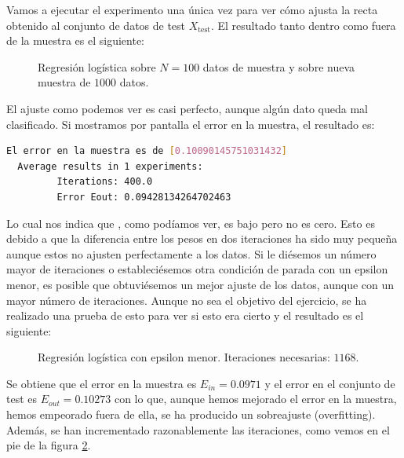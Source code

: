 \documentclass[12pt]{article}
\begin{document}
{Vamos a ejecutar el experimento una única vez para ver cómo ajusta la recta obtenido al conjunto de datos de test $X_{\operatorname{test}}$. El resultado  tanto dentro como fuera de la muestra es el siguiente:
\begin{figure}[H]
  \centering
  \qquad
  \caption{Regresión logística sobre $N=100$ datos de muestra y sobre nueva muestra de $1000$ datos. }
  \label{fig:myfig:2}
\end{figure}
El ajuste como podemos ver es casi perfecto, aunque algún dato queda mal clasificado. Si mostramos por pantalla el error en la muestra, el resultado es:
\begin{lstlisting}[language=bash]
  El error en la muestra es de [0.10090145751031432]
  Average results in 1 experiments:
         Iterations: 400.0
         Error Eout: 0.09428134264702463
\end{lstlisting}

Lo cual nos indica que , como podíamos ver, es bajo pero no es cero. Esto es debido a que la diferencia entre los pesos en dos iteraciones ha sido muy pequeña aunque estos no ajusten perfectamente a los datos. Si le diésemos un número mayor de iteraciones o estableciésemos otra condición de parada con un epsilon menor, es posible que obtuviésemos un mejor ajuste de los datos, aunque con un mayor número de iteraciones. Aunque no sea el objetivo del ejercicio, se ha realizado una prueba de esto para ver si esto era cierto y el resultado es el siguiente:

\begin{figure}[H]
  \centering
  \qquad
  \caption{Regresión logística con epsilon menor. Iteraciones necesarias: $1168$. }
  \label{fig:myfig:3}
\end{figure}
Se obtiene que el error en la muestra es $E_{in} = 0.0971$ y el error en el conjunto de test es $E_{out} = 0.10273$ con lo que, aunque hemos mejorado el error en la muestra, hemos empeorado fuera de ella, se ha producido un sobreajuste (overfitting). Además, se han incrementado razonablemente las iteraciones, como vemos en el pie de la figura \ref{fig:myfig:3}.\\

}
\end{document}
